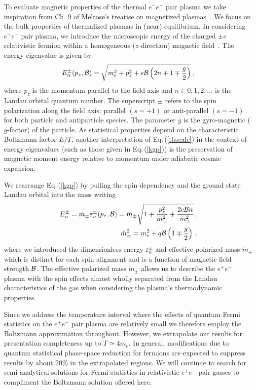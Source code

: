 \documentclass[reprint]{revtex4-2}
\newcommand{\req}[1]{Eq.\,(\ref{#1})}
\begin{document}
To evaluate magnetic properties of the thermal $e^-e^+$ pair plasma we take inspiration from Ch. 9 of Melrose's treatise on magnetized plasmas~\cite{melrose2008quantum}. We focus  on the bulk properties of thermalized plasmas in (near) equilibrium. In considering $e^{+}e^{-}$ pair plasma, we introduce the microscopic energy of the charged $\pm e$ relativistic fermion within a homogeneous ($z$-direction) magnetic field~\cite{steinmetz2018magnetic}. The energy eigenvalue is given by
\begin{align}
    \label{kgp}
    E^{\pm}_{n}(p_{z},{\cal B})=\sqrt{m_{e}^{2}+p_{z}^{2}+e{\cal B}\left(2n+1\mp\frac{g}{2}\right)}\,,
\end{align}
where $p_{z}$ is the momentum parallel to the field axis and $n\in0,1,2,\ldots$ is the Landau orbital quantum number. The superscript $\pm$ refers to the spin polarization along the field axis: parallel $(s=+1)$ or anti-parallel $(s=-1)$ for both particle and antiparticle species. The parameter $g$ is the gyro-magnetic ($g$-factor) of the particle. As statistical properties depend on the characteristic Boltzmann factor $E/T$, another interpretation of \req{tbscale} in the context of energy eigenvalues (such as those given in \req{kgp}) is the preservation of magnetic moment energy relative to momentum under adiabatic cosmic expansion.

We rearrange \req{kgp} by pulling the spin dependency and the ground state Landau orbital into the mass writing
\begin{align}
    \label{effmass}
    E^{\pm}_{n}={\tilde m}_{\pm}\varepsilon_{n}^{\pm}(p_{z},{\cal B})={\tilde m}_{\pm}\sqrt{1+\frac{p_{z}^{2}}{{\tilde m}_{\pm}^{2}}+\frac{2e{\cal B}n}{{\tilde m}_{\pm}^{2}}}\,,\\
    {\tilde m}_{\pm}^{2}=m_{e}^{2}+q{\cal B}\left(1\mp\frac{g}{2}\right)\,,
\end{align}
where we introduced the dimensionless energy $\varepsilon^{\pm}_{n}$ and effective polarized mass ${\tilde m}_{\pm}$ which is distinct for each spin alignment and is a function of magnetic field strength ${\cal B}$. The effective polarized mass ${\tilde m}_{\pm}$ allows us to describe the $e^{+}e^{-}$ plasma with the spin effects almost wholly separated from the Landau characteristics of the gas when considering the plasma's thermodynamic properties.

Since we address the temperature interval where the effects of quantum Fermi statistics on the $e^{+}e^{-}$ pair plasma are relatively small we therefore employ the Boltzmann approximation throughout. However, we extrapolate our results for presentation completeness up to $T\simeq 4m_{e}$. In general, modifications due to quantum statistical phase-space reduction for fermions are expected to suppress results by about 20\% in the extrapolated regions. We will continue to search for semi-analytical solutions for Fermi statistics in relativistic $e^{+}e^{-}$ pair gasses to compliment the Boltzmann solution offered here. 
\end{document}
